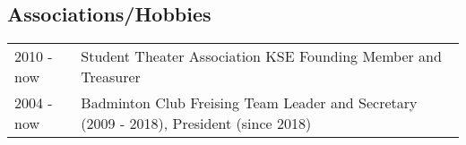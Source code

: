 \documentclass[a4paper,10pt]{memoir}
\begin{document}
\subsection*{Associations/Hobbies}
\vspace*{-\baselineskip}
\begin{longtable}{@{}p{} p{}}
  2010 - now &
  Student Theater Association KSE \newline 
  Founding Member and Treasurer
  \\
  2004 - now &
  Badminton Club Freising \newline 
  Team Leader and Secretary (2009 - 2018), President (since 2018)
\end{longtable}
\end{document}
